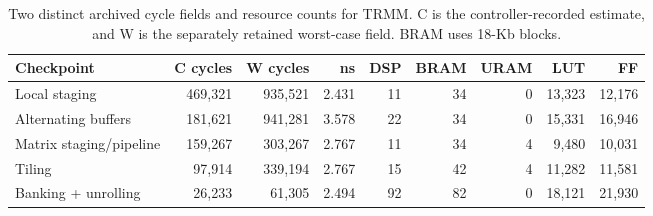 \begin{table}[t]
\centering
\caption{Two distinct archived cycle fields and resource counts for TRMM. C is the controller-recorded estimate, and W is the separately retained worst-case field.
BRAM uses 18-Kb blocks.}
\label{tab:sigmetrics-trmm-resources}
\footnotesize
\setlength{\tabcolsep}{2.5pt}
\begin{tabularx}{\linewidth}{@{}Xrrrrrrrr@{}}
\toprule
Checkpoint & C cycles & W cycles & ns & DSP & BRAM & URAM & LUT & FF \\
\midrule
Local staging & 469,321 & 935,521 & 2.431 & 11 & 34 & 0 & 13,323 & 12,176 \\
Alternating buffers & 181,621 & 941,281 & 3.578 & 22 & 34 & 0 & 15,331 & 16,946 \\
Matrix staging/pipeline & 159,267 & 303,267 & 2.767 & 11 & 34 & 4 & 9,480 & 10,031 \\
Tiling & 97,914 & 339,194 & 2.767 & 15 & 42 & 4 & 11,282 & 11,581 \\
Banking + unrolling & 26,233 & 61,305 & 2.494 & 92 & 82 & 0 & 18,121 & 21,930 \\
\bottomrule
\end{tabularx}
\end{table}
